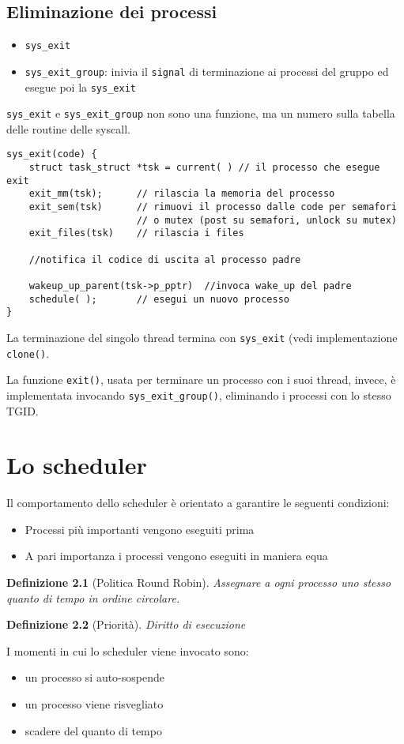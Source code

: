 \documentclass[12pt, a4paper]{report}
\newtheorem{definition}{Definizione}
\begin{document}
\section{Eliminazione dei processi}
\begin{itemize}
	\item \texttt{sys\_exit}
	\item \texttt{sys\_exit\_group}: inivia il \texttt{signal} di terminazione
		ai processi del gruppo ed esegue poi la \texttt{sys\_exit}
\end{itemize}
\texttt{sys\_exit} e \texttt{sys\_exit\_group} non sono una funzione, ma un
numero sulla tabella delle routine delle syscall.
\begin{verbatim}
sys_exit(code) {
    struct task_struct *tsk = current( ) // il processo che esegue exit
    exit_mm(tsk);      // rilascia la memoria del processo
    exit_sem(tsk)      // rimuovi il processo dalle code per semafori
                       // o mutex (post su semafori, unlock su mutex)
    exit_files(tsk)    // rilascia i files

    //notifica il codice di uscita al processo padre

    wakeup_up_parent(tsk->p_pptr)  //invoca wake_up del padre
    schedule( );       // esegui un nuovo processo
}
\end{verbatim}
La terminazione del singolo thread termina con \texttt{sys\_exit} (vedi
implementazione \texttt{clone()}.

La funzione \texttt{exit()}, usata per terminare un processo con i suoi thread,
invece, è implementata invocando \texttt{sys\_exit\_group()}, eliminando i
processi con lo stesso TGID.

\chapter{Lo scheduler}
Il comportamento dello scheduler è orientato a garantire le seguenti
condizioni:
\begin{itemize}
	\item Processi più importanti vengono eseguiti prima
	\item A pari importanza i processi vengono eseguiti in maniera equa
\end{itemize}
\begin{definition}[Politica Round Robin]
	Assegnare a ogni processo uno stesso quanto di tempo in ordine circolare.
\end{definition}
\begin{definition}[Priorità]
	Diritto di esecuzione
\end{definition}
I momenti in cui lo scheduler viene invocato sono:
\begin{itemize}
	\item un processo si auto-sospende
	\item un processo viene risvegliato
	\item scadere del quanto di tempo
\end{itemize}
\end{document}
